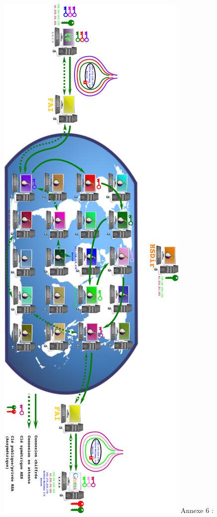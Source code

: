\documentclass[]{article}
\begin{document}
\includegraphics{images/Com_du_RDV_au_HS.png} Annexe 6 :
\end{document}
